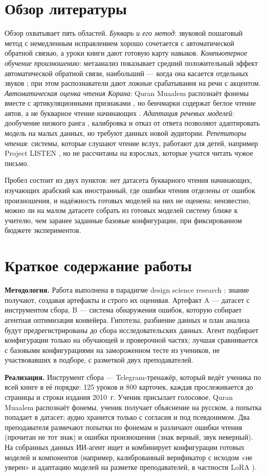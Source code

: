 \documentclass[a4paper,14pt,oneside]{extreport}
\newcommand{\annsection}[1]{\section*{#1}}
\begin{document}
\annsection{Обзор литературы}

Обзор охватывает пять областей. \emph{Букварь и его метод}: звуковой пошаговый метод с немедленным
исправлением хорошо сочетается с автоматической обратной связью, а уроки книги дают готовую карту навыков. \emph{Компьютерное обучение произношению}: метаанализ показывает средний
положительный эффект автоматической обратной связи, наибольший --- когда она касается отдельных звуков \cite{SRC-025}; при этом распознаватели дают ложные срабатывания на речи с акцентом.
\emph{Автоматическая оценка чтения Корана}: Quran Muaalem распознаёт фонемы вместе с артикуляционными
признаками \cite{SRC-002}, но бенчмарки содержат беглое чтение аятов, а не букварное чтение начинающих \cite{SRC-004}. \emph{Адаптация речевых моделей}: дообучение низкого ранга \cite{SRC-111},
калибровка и отказ от ответа позволяют адаптировать модель на малых данных, но требуют
данных новой аудитории. \emph{Репетиторы чтения}: системы, которые слушают чтение вслух, работают для детей, например
Project LISTEN \cite{SRC-125}, но не рассчитаны на взрослых, которые учатся читать чужое письмо.

Пробел состоит из двух пунктов: нет датасета букварного чтения начинающих, изучающих арабский как
иностранный, где ошибки чтения отделены от ошибок произношения, и надёжность готовых моделей на них не
оценена; неизвестно, можно ли на малом датасете собрать из готовых моделей систему ближе к учителю, чем
заранее заданные базовые конфигурации, при фиксированном бюджете экспериментов.

\annsection{Краткое содержание работы}

\textbf{Методология.} Работа выполнена в парадигме design science research \cite{SRC-100}: знание
получают, создавая артефакты и строго их оценивая. Артефакт A --- датасет с инструментом сбора, B --- система обнаружения ошибок, которую собирает агентная оптимизация конвейера.
Гипотезы, разбиение данных и план анализа будут предрегистрированы до сбора исследовательских данных. Агент подбирает конфигурации только на обучающей и проверочной частях; лучшая сравнивается с базовыми конфигурациями на замороженном тесте из учеников, не участвовавших
в подборе, с разметкой двух преподавателей.

\textbf{Реализация.} Инструмент сбора --- Telegram-тренажёр, который ведёт ученика по всей книге в её
порядке: 125 уроков и 800 карточек, каждая прослеживается до страницы и строки издания 2010~г. Ученик
присылает голосовое, Quran Muaalem распознаёт фонемы, ученик получает объяснение на русском, а
попытка попадает в датасет; аудио хранится только с согласия и под псевдонимом.
Два преподавателя размечают попытки по фонемам и различают ошибки чтения (прочитан не тот знак) и ошибки
произношения (знак верный, звук неверный). На собранных данных ИИ-агент ищет и
комбинирует конфигурации готовых моделей и компонентов (например, калиброванный верификатор с исходом «не
уверен» и адаптацию моделей на разметке преподавателей, в частности LoRA \cite{SRC-111}).
\end{document}
